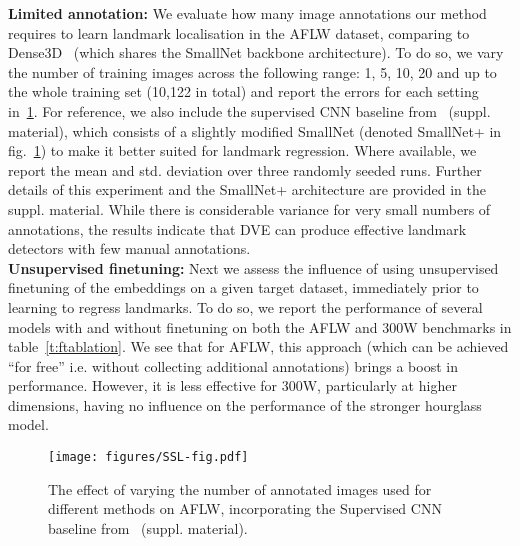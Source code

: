 \documentclass[10pt,twocolumn,letterpaper]{article}
\begin{document}
\noindent \textbf{Limited annotation:} We evaluate how many image annotations our method requires to learn landmark localisation in the AFLW dataset, comparing to Dense3D~\cite{thewlis17Bunsupervised} (which shares the SmallNet backbone architecture).
To do so, we vary the number of training images across the following range: 1, 5, 10, 20 and up to the whole training set (10,122 in total) and report the errors for each setting in~\cref{f:ntrainchart}.   For reference, we also include the supervised CNN baseline from~\cite{thewlis17unsupervised} (suppl. material), which consists of a slightly modified SmallNet (denoted SmallNet+ in fig.~\ref{f:ntrainchart}) to make it better suited for landmark regression.  Where available, we report the mean and std. deviation over three randomly seeded runs.  Further details of this experiment and the SmallNet+ architecture are provided in the suppl. material.  While there is considerable variance for very small numbers of annotations, the results indicate that DVE can produce effective landmark detectors with few manual annotations. \\

\noindent \textbf{Unsupervised finetuning:} Next we assess the influence of using unsupervised finetuning of the embeddings on a given target dataset, immediately prior to learning to regress landmarks.  To do so, we report the performance of several models with and without finetuning on both the AFLW and 300W benchmarks in table~\ref{t:ftablation}.  We see that for AFLW, this approach (which can be achieved ``for free'' i.e. without collecting additional annotations) brings a boost in performance.  However, it is less effective for 300W, particularly at higher dimensions, having no influence on the performance of the stronger hourglass model. 


\begin{figure}[t]
\centering
\texttt{[image: figures/SSL-fig.pdf]}
\caption{The effect of varying the number of annotated images used for different methods on AFLW, incorporating the Supervised CNN baseline from~\cite{thewlis17unsupervised} (suppl. material). } 
\label{f:ntrainchart}
\vspace{-0.1cm}
\end{figure}
\end{document}
